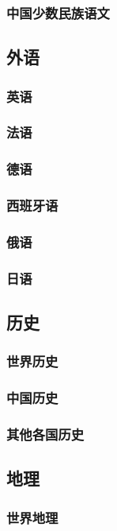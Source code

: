 \documentclass[UTF8]{../../ApplicationUniverse}
\begin{document}
        \subsubsection{中国少数民族语文}
    \subsection{外语}
        \subsubsection{英语}
        \subsubsection{法语}
        \subsubsection{德语}
        \subsubsection{西班牙语}
        \subsubsection{俄语}
        \subsubsection{日语}
    
    \subsection{历史}
        \subsubsection{世界历史}
        \subsubsection{中国历史}
        \subsubsection{其他各国历史}
    \subsection{地理}
        \subsubsection{世界地理}
\end{document}
